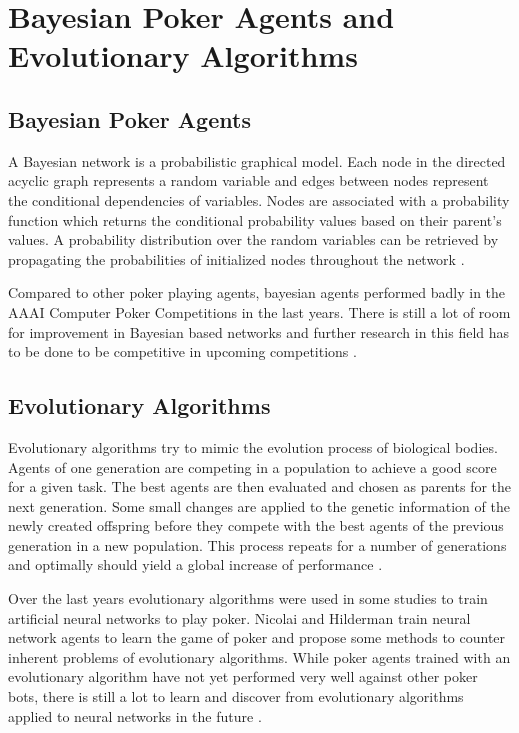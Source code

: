 \section{Bayesian Poker Agents and Evolutionary Algorithms}
\subsection{Bayesian Poker Agents}
A Bayesian network is a probabilistic graphical model. Each node in the directed acyclic graph represents a random variable and edges between nodes represent the conditional dependencies of variables. Nodes are associated with a probability function which returns the conditional probability values based on their parent's values. A probability distribution over the random variables can be retrieved by propagating the probabilities of initialized nodes throughout the network \cite{review}. \par
Compared to other poker playing agents, bayesian agents performed badly in the AAAI Computer Poker Competitions in the last years. There is still a lot of room for improvement in Bayesian based networks and further research in this field has to be done to be competitive in upcoming competitions \cite{review}. 
\subsection{Evolutionary Algorithms}
Evolutionary algorithms try to mimic the evolution process of biological bodies. Agents of one generation are competing in a population to achieve a good score for a given task. The best agents are then evaluated and chosen as parents for the next generation. Some small changes are applied to the genetic information of the newly created offspring before they compete with the best agents of the previous generation in a new population. This process repeats for a number of generations and optimally should yield a global increase of performance \cite{evolutionary_methods}.\par
Over the last years evolutionary algorithms were used in some studies to train artificial neural networks to play poker. Nicolai and Hilderman \cite{nn_evolve} train neural network agents to learn the game of poker and propose some methods to counter inherent problems of evolutionary algorithms. While poker agents trained with an evolutionary algorithm have not yet performed very well against other poker bots, there is still a lot to learn and discover from evolutionary algorithms applied to neural networks in the future \cite{review}. 
